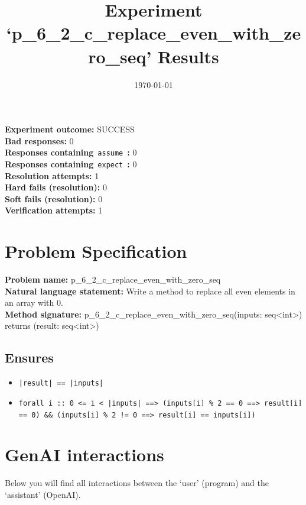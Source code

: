 \documentclass{article}
\begin{document}
\title{Experiment `p\_6\_2\_c\_replace\_even\_with\_zero\_seq' Results}
\author{\today}
\date{}
\maketitle
\textbf{Experiment outcome: }SUCCESS
\\\textbf{Bad responses: }0
\\\textbf{Responses containing}~\texttt{assume}~\textbf{: }0
\\\textbf{Responses containing}~\texttt{expect}~\textbf{: }0
\\\textbf{Resolution attempts: }1
\\\textbf{Hard fails (resolution): }0
\\\textbf{Soft fails (resolution): }0
\\\textbf{Verification attempts: }1
\section*{Problem Specification}
\textbf{Problem name: }p\_6\_2\_c\_replace\_even\_with\_zero\_seq
\\\textbf{Natural language statement: }Write a method to replace all even elements in an array with 0.
\\\textbf{Method signature: }p\_6\_2\_c\_replace\_even\_with\_zero\_seq(inputs: seq<int>) returns (result: seq<int>)
\subsection*{Ensures}
\begin{itemize}
\item \texttt{|result| == |inputs|}
\item \texttt{forall i :: 0 <= i < |inputs| ==> (inputs[i] \% 2 == 0 ==> result[i] == 0) \&\& (inputs[i] \% 2 != 0 ==> result[i] == inputs[i])}
\end{itemize}
\clearpage
\section*{GenAI interactions}
Below you will find all interactions between the `user' (program) and the `assistant' (OpenAI).
\end{document}
